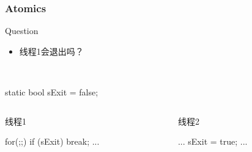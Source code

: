\documentclass[UTF8,lualatex]{ctexbeamer}
\begin{document}
\begin{frame}[fragile,t]
    \frametitle{Atomics}
    \begin{alertblock}{Question}
        \begin{itemize}
            \item 线程1会退出吗？
        \end{itemize}
    \end{alertblock}
    \begin{exampleblock}{~}
        \begin{cppcode}
            static bool sExit = false;
        \end{cppcode}
    \end{exampleblock}
    \begin{columns}[t]
        \begin{column}{.45\textwidth}
            \begin{exampleblock}{线程1}
                \begin{cppcode}
                    for(;;) {
                        if (sExit) break;
                        ...
                    }
                \end{cppcode}
            \end{exampleblock}
        \end{column}
        \begin{column}{.45\textwidth}
            \begin{exampleblock}{线程2}
                \begin{cppcode}
                    ...
                    sExit = true;
                    ...
                \end{cppcode}
            \end{exampleblock}
        \end{column}
    \end{columns}
\end{frame}

\end{document}
